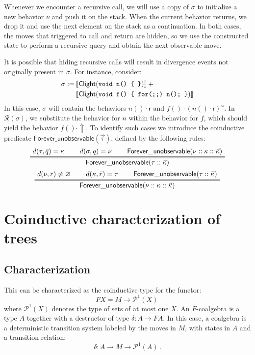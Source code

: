 \documentclass[11pt]{article}
\newcommand{\kw}[1]{{\mathsf{#1}}}
\begin{document}
Whenever we encounter a recursive call,
we will use a copy of $\sigma$
to initialize a new behavior $\nu$ and push it on the stack.
When the current behavior returns,
we drop it and use the next element on the stack as a continuation.
In both cases,
the moves that triggered to call and return are hidden,
so we use the constructed state to perform a recursive query
and obtain the next observable move.

It is possible that hiding recursive calls
will result in divergence events not originally present in $\sigma$.
For instance, consider:
\begin{align*}
  \sigma := \: &\llbracket \kw{Clight}(\mbox{\tt void n() \{ \}}) \rrbracket \: + \\
 &\llbracket \kw{Clight}(\mbox{\tt void f() \{ for(;;) n(); \}}) \rrbracket
\end{align*}
In this case, $\sigma$ will contain the behaviors
$n() \cdot \kw{r}$ and $f() \cdot (\bar{n}() \cdot \bar{\kw{r}})^\omega$.
In $\mathcal{R}(\sigma)$,
we substitute the behavior for $n$ within the behavior for $f$,
which should yield the behavior $f() \cdot \Uparrow$.
To identify such cases we introduce the coinductive predicate
$\kw{Forever\_unobservable}(\vec{\tau})$,
defined by the following rules:
\[
  \AxiomC{$d(\tau, \bar{q}) = \kappa$}
  \AxiomC{$d(\sigma, q) = \nu$}
  \AxiomC{$\kw{Forever\_unobservable}(\nu :: \kappa :: \vec{\kappa})$}
  \doubleLine
  \TrinaryInfC{$\kw{Forever\_unobservable}(\tau :: \vec{\kappa})$}
  \DisplayProof
\]
\[
  \AxiomC{$d(\nu, r) \ne \varnothing$}
  \AxiomC{$d(\kappa, \bar{r}) = \tau$}
  \AxiomC{$\kw{Forever\_unobservable}(\tau :: \vec{\kappa})$}
  \doubleLine
  \TrinaryInfC{$\kw{Forever\_unobservable}(\nu :: \kappa :: \vec{\kappa})$}
  \DisplayProof
\]

\vfill




\appendix

\section{Coinductive characterization of trees}
\label{sec:treecoind}

\subsection{Characterization}

This can be characterized as the coinductive type for the functor:
\[ F X = M \rightarrow \mathcal{P}^1(X)\, \]
where $\mathcal{P}^1(X)$ denotes the type of sets of at most one $X$.
An $F$-coalgebra is a type $A$
together with a destructor of type $\delta : A \rightarrow F A$.
In this case, a coalgebra is a deterministic transition system
labeled by the moves in $M$,
with states in $A$ and a transition relation:
\[ \delta : A \rightarrow M \rightarrow \mathcal{P}^1(A) \, . \]
\end{document}
